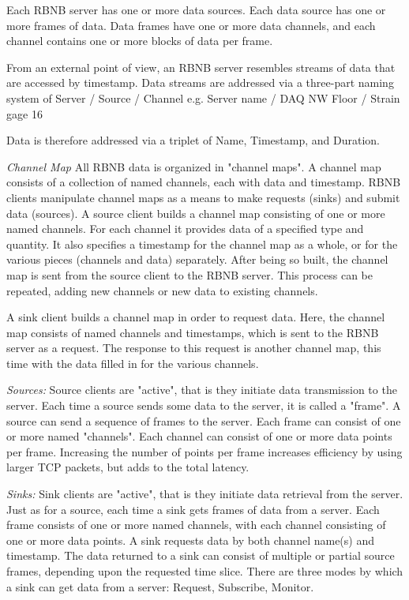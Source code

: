 Each RBNB server has one or more data sources. Each data source has one or more frames of data. Data frames have one or more data channels, and each channel contains one or more blocks of data per frame. 

From an external point of view, an RBNB server resembles streams of data that are accessed by timestamp. Data streams are addressed via a three-part naming system of Server / Source / Channel
e.g. Server name / DAQ NW Floor / Strain gage 16

Data is therefore addressed via a triplet of Name, Timestamp, and Duration. 

\emph{Channel Map}
All RBNB data is organized in "channel maps".  A channel map consists of a collection of named channels, each with data and timestamp.  RBNB clients manipulate channel maps as a means to make requests (sinks) and submit data (sources).
A source client builds a channel map consisting of one or more named channels.  For each channel it provides data of a specified type and quantity.  It also specifies a  timestamp for the channel map as a whole, or for the various pieces (channels and data) separately.  After being so built, the channel map is sent from the source client to the RBNB server.  This process can be repeated, adding new channels or new data to existing channels.

A sink client builds a channel map in order to request data.  Here, the channel map consists of named channels and timestamps, which is sent to the RBNB server as a request.  The response to this request is another channel map, this time with the data filled in for the various channels.

\emph{Sources:}
Source clients are "active", that is they initiate data transmission to the server.  Each time a source sends some data to the server, it is called a "frame".  A source can send a sequence of frames to the server.  Each frame can consist of one or more named "channels".  Each channel can consist of one or more data points per frame. Increasing the number of points per frame increases efficiency by using larger TCP packets, but adds to the total latency. 

\emph{Sinks:}
Sink clients are "active", that is they initiate data retrieval from the server.  Just as for a source, each time a sink gets frames of data from a server.  Each frame consists of one or more named channels, with each channel consisting of one or more data points. A sink requests data by both channel name(s) and timestamp.  The data returned to a sink can consist of multiple or partial source frames, depending upon the requested time slice.  There are three modes by which a sink can get data from a server: Request, Subscribe, Monitor.


